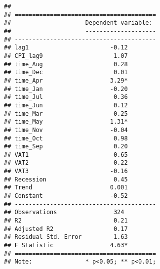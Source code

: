 \documentclass[
]{article}
\begin{document}
\begin{verbatim}
## 
## ========================================
##                     Dependent variable: 
##                     --------------------
## ----------------------------------------
## lag1                       -0.12        
## CPI_lag9                    1.07        
## time_Aug                    0.28        
## time_Dec                    0.01        
## time_Apr                   3.29*        
## time_Jan                   -0.20        
## time_Jul                    0.36        
## time_Jun                    0.12        
## time_Mar                    0.25        
## time_May                   1.31*        
## time_Nov                   -0.04        
## time_Oct                    0.98        
## time_Sep                    0.20        
## VAT1                       -0.65        
## VAT2                        0.22        
## VAT3                       -0.16        
## Recession                   0.45        
## Trend                      0.001        
## Constant                   -0.52        
## ----------------------------------------
## Observations                324         
## R2                          0.21        
## Adjusted R2                 0.17        
## Residual Std. Error         1.63        
## F Statistic                4.63*        
## ========================================
## Note:               * p<0.05; ** p<0.01;
\end{verbatim}
\end{document}

